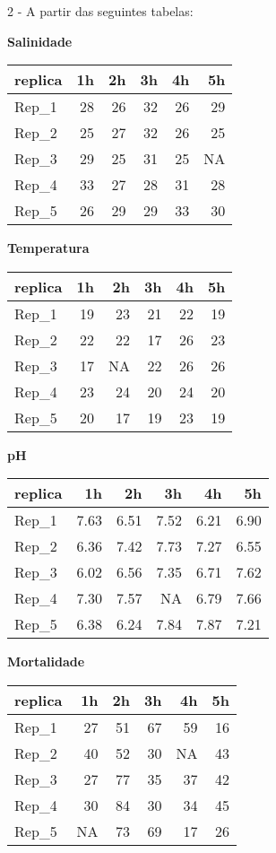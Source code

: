 \documentclass[]{book}
\begin{document}
2 - A partir das seguintes tabelas:

\textbf{Salinidade}

\begin{tabular}{l|r|r|r|r|r}
\hline
replica & 1h & 2h & 3h & 4h & 5h\\
\hline
Rep\_1 & 28 & 26 & 32 & 26 & 29\\
\hline
Rep\_2 & 25 & 27 & 32 & 26 & 25\\
\hline
Rep\_3 & 29 & 25 & 31 & 25 & NA\\
\hline
Rep\_4 & 33 & 27 & 28 & 31 & 28\\
\hline
Rep\_5 & 26 & 29 & 29 & 33 & 30\\
\hline
\end{tabular}

\textbf{Temperatura}

\begin{tabular}{l|r|r|r|r|r}
\hline
replica & 1h & 2h & 3h & 4h & 5h\\
\hline
Rep\_1 & 19 & 23 & 21 & 22 & 19\\
\hline
Rep\_2 & 22 & 22 & 17 & 26 & 23\\
\hline
Rep\_3 & 17 & NA & 22 & 26 & 26\\
\hline
Rep\_4 & 23 & 24 & 20 & 24 & 20\\
\hline
Rep\_5 & 20 & 17 & 19 & 23 & 19\\
\hline
\end{tabular}

\textbf{pH}

\begin{tabular}{l|r|r|r|r|r}
\hline
replica & 1h & 2h & 3h & 4h & 5h\\
\hline
Rep\_1 & 7.63 & 6.51 & 7.52 & 6.21 & 6.90\\
\hline
Rep\_2 & 6.36 & 7.42 & 7.73 & 7.27 & 6.55\\
\hline
Rep\_3 & 6.02 & 6.56 & 7.35 & 6.71 & 7.62\\
\hline
Rep\_4 & 7.30 & 7.57 & NA & 6.79 & 7.66\\
\hline
Rep\_5 & 6.38 & 6.24 & 7.84 & 7.87 & 7.21\\
\hline
\end{tabular}

\textbf{Mortalidade}

\begin{tabular}{l|r|r|r|r|r}
\hline
replica & 1h & 2h & 3h & 4h & 5h\\
\hline
Rep\_1 & 27 & 51 & 67 & 59 & 16\\
\hline
Rep\_2 & 40 & 52 & 30 & NA & 43\\
\hline
Rep\_3 & 27 & 77 & 35 & 37 & 42\\
\hline
Rep\_4 & 30 & 84 & 30 & 34 & 45\\
\hline
Rep\_5 & NA & 73 & 69 & 17 & 26\\
\hline
\end{tabular}
\end{document}
